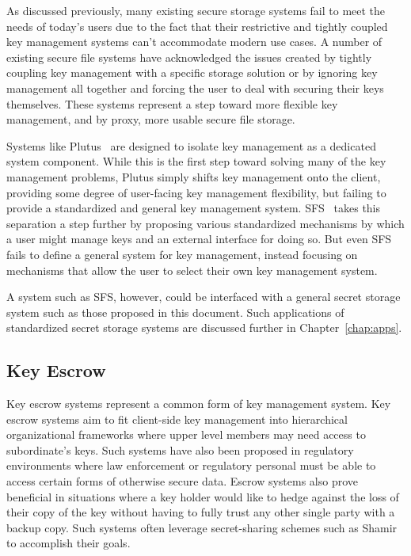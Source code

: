 As discussed previously, many existing secure storage systems fail to
meet the needs of today's users due to the fact that their restrictive
and tightly coupled key management systems can't accommodate modern
use cases. A number of existing secure file systems have acknowledged
the issues created by tightly coupling key management with a specific
storage solution or by ignoring key management all together and
forcing the user to deal with securing their keys themselves. These
systems represent a step toward more flexible key management, and by
proxy, more usable secure file storage.

Systems like Plutus~\cite{kallahalla2003} are designed to isolate key
management as a dedicated system component. While this is the first
step toward solving many of the key management problems, Plutus simply
shifts key management onto the client, providing some degree of
user-facing key management flexibility, but failing to provide a
standardized and general key management
system. SFS~\cite{mazieres1999} takes this separation a step further
by proposing various standardized mechanisms by which a user might
manage keys and an external interface for doing so. But even SFS fails
to define a general system for key management, instead focusing on
mechanisms that allow the user to select their own key management
system.

A system such as SFS, however, could be interfaced with a general
secret storage system such as those proposed in this document. Such
applications of standardized secret storage systems are discussed
further in Chapter~\ref{chap:apps}.

\subsection{Key Escrow}

Key escrow systems represent a common form of key management system.
Key escrow systems aim to fit client-side key management into
hierarchical organizational frameworks where upper level members may
need access to subordinate's keys. Such systems have also been
proposed in regulatory environments where law enforcement or
regulatory personal must be able to access certain forms of otherwise
secure data. Escrow systems also prove beneficial in situations where
a key holder would like to hedge against the loss of their copy of the
key without having to fully trust any other single party with a backup
copy. Such systems often leverage secret-sharing schemes such as
Shamir~\cite{shamir1979} to accomplish their goals.

